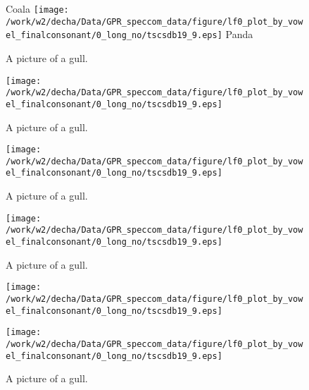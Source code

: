 \documentclass{article}
\begin{document}
\begin{figure}[t]

  \begin{minipage}[b]{.24\textwidth}
  Coala
  \centering
    \texttt{[image: /work/w2/decha/Data/GPR\_speccom\_data/figure/lf0\_plot\_by\_vowel\_finalconsonant/0\_long\_no/tscsdb19\_9.eps]}
    Panda
    \end{minipage}
  \begin{minipage}[b]{.24\textwidth}
  \caption{A picture of a gull.}
  \centering
    \texttt{[image: /work/w2/decha/Data/GPR\_speccom\_data/figure/lf0\_plot\_by\_vowel\_finalconsonant/0\_long\_no/tscsdb19\_9.eps]}
  \end{minipage}
    \begin{minipage}[b]{.24\textwidth}
  \caption{A picture of a gull.}
  \centering
    \texttt{[image: /work/w2/decha/Data/GPR\_speccom\_data/figure/lf0\_plot\_by\_vowel\_finalconsonant/0\_long\_no/tscsdb19\_9.eps]}
  \end{minipage}
    \begin{minipage}[b]{.24\textwidth}
  \caption{A picture of a gull.}
  \centering
    \texttt{[image: /work/w2/decha/Data/GPR\_speccom\_data/figure/lf0\_plot\_by\_vowel\_finalconsonant/0\_long\_no/tscsdb19\_9.eps]}
  \end{minipage}
  \begin{minipage}[b]{.24\textwidth}
  \caption{A picture of a gull.}
  \centering
    \texttt{[image: /work/w2/decha/Data/GPR\_speccom\_data/figure/lf0\_plot\_by\_vowel\_finalconsonant/0\_long\_no/tscsdb19\_9.eps]}
  \end{minipage}
      \begin{minipage}[b]{.24\textwidth}
  \caption{A picture of a gull.}
  \centering
    \texttt{[image: /work/w2/decha/Data/GPR\_speccom\_data/figure/lf0\_plot\_by\_vowel\_finalconsonant/0\_long\_no/tscsdb19\_9.eps]}
  \end{minipage}
\end{figure}
\end{document}
